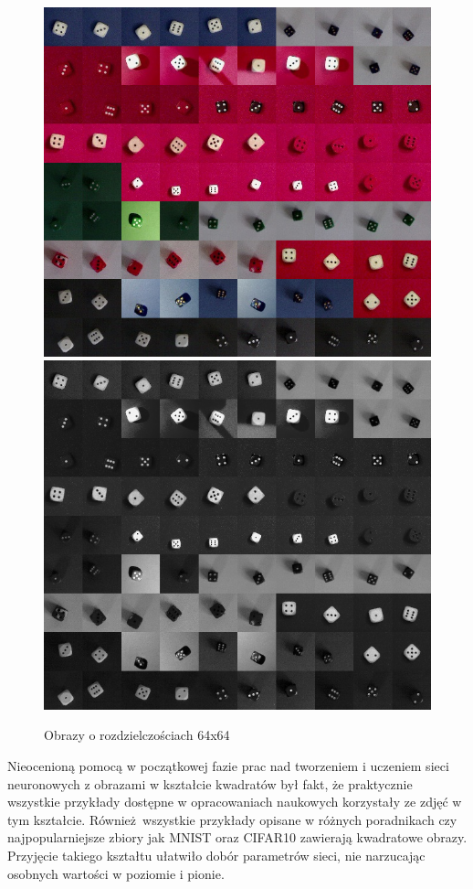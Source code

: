 \begin{figure}[h]
\centering
\includegraphics[scale=0.35]{images/kolaz}
\includegraphics[scale=0.35]{images/kolaz_grayscale}
\caption{Obrazy o rozdzielczościach 64x64}
\end{figure}

Nieocenioną pomocą w początkowej fazie prac nad tworzeniem i uczeniem sieci neuronowych
z obrazami w kształcie kwadratów był fakt, że praktycznie wszystkie przykłady dostępne
w opracowaniach naukowych korzystały ze zdjęć w tym kształcie. Również wszystkie
przykłady opisane w różnych poradnikach czy najpopularniejsze zbiory jak MNIST oraz
CIFAR10 zawierają kwadratowe obrazy. Przyjęcie takiego kształtu ułatwiło dobór parametrów
sieci, nie narzucając osobnych wartości w poziomie i pionie.

